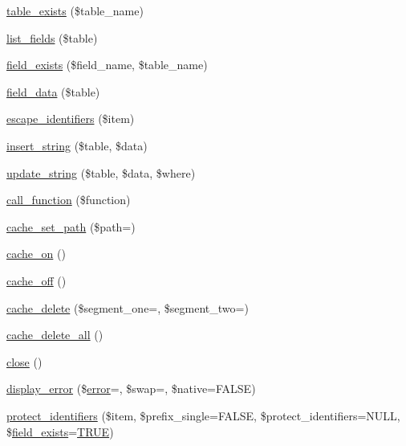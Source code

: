 \begin{DoxyCompactItemize}
\item 
\mbox{\hyperlink{class_c_i___d_b__driver_af148cb2cd5d490d2a480c0c741ceed03}{table\+\_\+exists}} (\$table\+\_\+name)
\item 
\mbox{\hyperlink{class_c_i___d_b__driver_aef08cd376b16b24608100ca0e3f2f85b}{list\+\_\+fields}} (\$table)
\item 
\mbox{\hyperlink{class_c_i___d_b__driver_ad349ffee1eed59a2eb8f0f1d3033764f}{field\+\_\+exists}} (\$field\+\_\+name, \$table\+\_\+name)
\item 
\mbox{\hyperlink{class_c_i___d_b__driver_a90355121e1ed009e0efdbd544ab56efa}{field\+\_\+data}} (\$table)
\item 
\mbox{\hyperlink{class_c_i___d_b__driver_abe5c555644f8bac97c3f84c7d2325fdc}{escape\+\_\+identifiers}} (\$item)
\item 
\mbox{\hyperlink{class_c_i___d_b__driver_ad27720d886add2c9abf9ac48a9ff56d5}{insert\+\_\+string}} (\$table, \$data)
\item 
\mbox{\hyperlink{class_c_i___d_b__driver_af9eb76a74d10fa81e44ecb0dd9bf00d4}{update\+\_\+string}} (\$table, \$data, \$where)
\item 
\mbox{\hyperlink{class_c_i___d_b__driver_af7892f758c89d0e243def92140dbe099}{call\+\_\+function}} (\$function)
\item 
\mbox{\hyperlink{class_c_i___d_b__driver_aec8df4c9b46f8ba06831911d4c3121df}{cache\+\_\+set\+\_\+path}} (\$path=\textquotesingle{}\textquotesingle{})
\item 
\mbox{\hyperlink{class_c_i___d_b__driver_a69ca9bb8bc31400922a565d5c4d64d8d}{cache\+\_\+on}} ()
\item 
\mbox{\hyperlink{class_c_i___d_b__driver_ae577e2be88cb5f0d184f76dc6fd87482}{cache\+\_\+off}} ()
\item 
\mbox{\hyperlink{class_c_i___d_b__driver_a4ccac0d027f9e49091f98d0acbbff13c}{cache\+\_\+delete}} (\$segment\+\_\+one=\textquotesingle{}\textquotesingle{}, \$segment\+\_\+two=\textquotesingle{}\textquotesingle{})
\item 
\mbox{\hyperlink{class_c_i___d_b__driver_a6e74f4d3938c78892f490b4f11faf318}{cache\+\_\+delete\+\_\+all}} ()
\item 
\mbox{\hyperlink{class_c_i___d_b__driver_aa69c8bf1f1dcf4e72552efff1fe3e87e}{close}} ()
\item 
\mbox{\hyperlink{class_c_i___d_b__driver_a1ca178ae41a8c6c0e461dfb2653cfd81}{display\+\_\+error}} (\$\mbox{\hyperlink{class_c_i___d_b__driver_a43b8d30b879d4f09ceb059b02af2bc02}{error}}=\textquotesingle{}\textquotesingle{}, \$swap=\textquotesingle{}\textquotesingle{}, \$native=F\+A\+L\+SE)
\item 
\mbox{\hyperlink{class_c_i___d_b__driver_ade8e28ac268bbe2f985c5359bc949f21}{protect\+\_\+identifiers}} (\$item, \$prefix\+\_\+single=F\+A\+L\+SE, \$protect\+\_\+identifiers=N\+U\+LL, \$\mbox{\hyperlink{class_c_i___d_b__driver_ad349ffee1eed59a2eb8f0f1d3033764f}{field\+\_\+exists}}=\mbox{\hyperlink{constants_8php_ae04a3efe6aa42044f803ee90c2277846}{T\+R\+UE}})
\end{DoxyCompactItemize}
